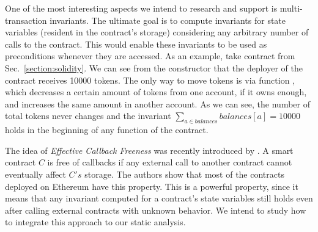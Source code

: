 One of the most interesting aspects we intend to research and support is
multi-transaction invariants.
%
The ultimate goal is to compute invariants for state variables (resident in the
contract's storage) considering any arbitrary number of calls to the contract.
%
This would enable these invariants to be used as preconditions whenever they
are accessed.
%
As an example, take contract  from Sec.~\ref{section:solidity}.
%
We can see from the constructor that the deployer of the contract receives
10000 tokens.
%
The only way to move tokens is via function , which decreases a
certain amount of tokens from one account, if it owns enough, and increases the
same amount in another account.
%
As we can see, the number of total tokens never changes and the invariant
$\sum_{a \in balances} balances[a] = 10000$ holds in the beginning of any
function of the contract.

The idea of \emph{Effective Callback Freeness} was recently introduced by
\cite{Grossman}.
%
A smart contract $C$ is free of callbacks if any external call to another
contract cannot eventually affect $C's$ storage.
%
The authors show that most of the contracts deployed on Ethereum have this
property.
%
This is a powerful property, since it means that any invariant computed for a
contract's state variables still holds even after calling external contracts
with unknown behavior.
%
We intend to study how to integrate this approach to our static analysis.
